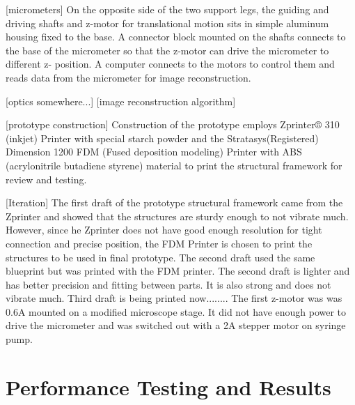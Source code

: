 \documentclass{article}
\begin{document}
[micrometers]
	On the opposite side of the two support legs, the guiding and driving shafts and z-motor for 
translational motion sits in simple aluminum housing fixed to the base. A connector block mounted on the 
shafts connects to the base of the micrometer so that the z-motor can drive the micrometer to different z-
position. A computer connects to the motors to control them and reads data from the micrometer for image 
reconstruction. 
	
[optics somewhere...]
[image reconstruction algorithm]

[prototype construction]
	Construction of the prototype employs Zprinter® 310 (inkjet) Printer with special starch powder 
and the Stratasys(Registered) Dimension 1200 FDM (Fused deposition modeling) Printer with ABS 
(acrylonitrile butadiene styrene) material to print the structural framework for review and testing.

[Iteration]
	The first draft of the prototype structural framework came from the Zprinter and showed that the 
structures are sturdy enough to not vibrate much. However, since he Zprinter does not have good enough 
resolution for tight connection and precise position, the FDM Printer is chosen to print the structures to be 
used in final prototype. The second draft used the same blueprint but was printed with the FDM printer. The 
second draft is lighter and has better precision and fitting between parts. It is also strong and does not 
vibrate much.  Third draft is being printed now........
	The first z-motor was was 0.6A mounted on a modified microscope stage. It did not have enough 
power to drive the micrometer and was switched out with a 2A stepper motor on syringe pump.


\section{Performance Testing and Results}
\label{sec:perf-test-results}
\end{document}
